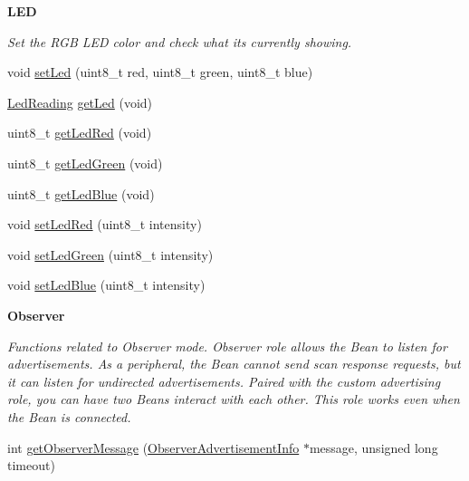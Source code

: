 \begin{Indent}{\bf L\+E\+D}\par
{\em Set the R\+G\+B L\+E\+D color and check what it\textquotesingle{}s currently showing. }\begin{DoxyCompactItemize}
\item 
void \hyperlink{class_bean_class_a7af1f9d1edb112f761db9b69686b5a5a}{set\+Led} (uint8\+\_\+t red, uint8\+\_\+t green, uint8\+\_\+t blue)
\item 
\hyperlink{struct_l_e_d___s_e_t_t_i_n_g___t}{Led\+Reading} \hyperlink{class_bean_class_ab73794fbf27d0297ead453ca60ac4aaf}{get\+Led} (void)
\item 
uint8\+\_\+t \hyperlink{class_bean_class_aea8736bf91c03de609233ddb270fb77d}{get\+Led\+Red} (void)
\item 
uint8\+\_\+t \hyperlink{class_bean_class_a5619292a562731e94f97e93432ab3639}{get\+Led\+Green} (void)
\item 
uint8\+\_\+t \hyperlink{class_bean_class_a8dcd68a87dc75dd0fe912483cc05fa43}{get\+Led\+Blue} (void)
\item 
void \hyperlink{class_bean_class_adfc2642320c53819c83bbaa59bbcef9b}{set\+Led\+Red} (uint8\+\_\+t intensity)
\item 
void \hyperlink{class_bean_class_ae1955c0312d1fa90bfeb847dada48c8c}{set\+Led\+Green} (uint8\+\_\+t intensity)
\item 
void \hyperlink{class_bean_class_ac09c0f3cea6025e2e12e8b6c5419434b}{set\+Led\+Blue} (uint8\+\_\+t intensity)
\end{DoxyCompactItemize}
\end{Indent}
\begin{Indent}{\bf Observer}\par
{\em Functions related to Observer mode. Observer role allows the Bean to listen for advertisements. As a peripheral, the Bean cannot send scan response requests, but it can listen for undirected advertisements. Paired with the custom advertising role, you can have two Beans interact with each other. This role works even when the Bean is connected. }\begin{DoxyCompactItemize}
\item 
int \hyperlink{class_bean_class_a5aa91cc9c0a3e17da864978845735ded}{get\+Observer\+Message} (\hyperlink{struct_o_b_s_e_r_v_e_r___i_n_f_o___m_e_s_s_a_g_e___t}{Observer\+Advertisement\+Info} $\ast$message, unsigned long timeout)
\end{DoxyCompactItemize}
\end{Indent}
